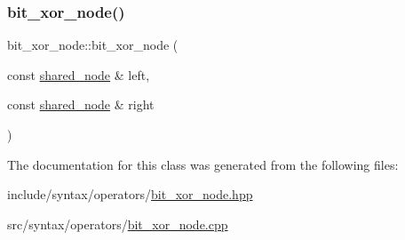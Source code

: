 \subsubsection{\texorpdfstring{bit\+\_\+xor\+\_\+node()}{bit\_xor\_node()}}
{\footnotesize\ttfamily bit\+\_\+xor\+\_\+node\+::bit\+\_\+xor\+\_\+node (\begin{DoxyParamCaption}\item[{const \hyperlink{namespacejawe_a3f307481d921b6cbb50cc8511fc2b544}{shared\+\_\+node} \&}]{left,  }\item[{const \hyperlink{namespacejawe_a3f307481d921b6cbb50cc8511fc2b544}{shared\+\_\+node} \&}]{right }\end{DoxyParamCaption})}



The documentation for this class was generated from the following files\+:\begin{DoxyCompactItemize}
\item 
include/syntax/operators/\hyperlink{bit__xor__node_8hpp}{bit\+\_\+xor\+\_\+node.\+hpp}\item 
src/syntax/operators/\hyperlink{bit__xor__node_8cpp}{bit\+\_\+xor\+\_\+node.\+cpp}\end{DoxyCompactItemize}
